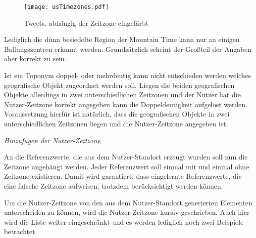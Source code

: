 					 \begin{figure}[!ht]
						\begin{center}
							\texttt{[image: usTimezones.pdf]}
							\caption{Tweets, abhängig der Zeitzone eingefärbt}
							\label{img:usTimezones}
						\end{center}
					\end{figure}	

					Lediglich die dünn besiedelte Region der Mountain Time kann nur an einigen Ballungszentren erkannt werden. 
					Grundsätzlich scheint der Großteil der Angaben aber korrekt zu sein.

					Ist ein Toponym doppel- oder mehrdeutig kann nicht entschieden werden welches geografische Objekt zugeordnet werden soll.
					Liegen die beiden geografischen Objekte allerdings in zwei unterschiedlichen Zeitzonen und der Nutzer hat die Nutzer-Zeitzone korrekt angegeben kann die Doppeldeutigkeit aufgelöst werden.
					Voraussetzung hierfür ist natürlich, dass die geografischen Objekte in zwei unterschiedlichen Zeitzonen liegen und die Nutzer-Zeitzone angegeben ist.

				\textit{Hinzufügen der Nutzer-Zeitzone} 

					An die Referenzwerte, die aus dem Nutzer-Standort erzeugt wurden soll nun die Zeitzone angehängt werden.
					Jeder Referenzwert soll einmal mit und einmal ohne Zeitzone existieren. 
					Damit wird garantiert, dass eingelernte Referenzwerte, die eine falsche Zeitzone aufweisen, trotzdem berücksichtigt werden können. 

					Um die Nutzer-Zeitzone von den aus dem Nutzer-Standort generierten Elementen unterscheiden zu können, wird die Nutzer-Zeitzone kursiv geschrieben.
					Auch hier wird die Liste weiter eingeschränkt und es werden lediglich noch zwei Beispiele betrachtet.
					
